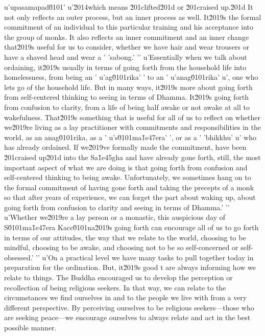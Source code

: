 u'upasamapad\u0101'
u'\u2014which means \u201clifted\u201d or \u201craised up.\u201d It not only reflects an outer process, but an inner process as well. It\u2019s the formal commitment of an individual to this particular training and his acceptance into the group of monks. It also reflects an inner commitment and an inner change that\u2019s useful for us to consider, whether we have hair and wear trousers or have a shaved head and wear a '
'sabong.'
'\n'
u'Essentially when we talk about ordaining, it\u2019s usually in terms of going forth from the household life into homelessness, from being an '
u'ag\u0101rika'
' to an '
u'anag\u0101rika'
u', one who lets go of the household life. But in many ways, it\u2019s more about going forth from self-centered thinking to seeing in terms of Dhamma. It\u2019s going forth from confusion to clarity, from a life of being half awake or not awake at all to wakefulness. That\u2019s something that is useful for all of us to reflect on whether we\u2019re living as a lay practitioner with commitments and responsibilities in the world, as an anag\u0101rika, as a '
u's\u0101ma\u1e47era'
', or as a '
'bhikkhu'
u' who has already ordained. If we\u2019ve formally made the commitment, have been \u201craised up\u201d into the Sa\u1e45gha and have already gone forth, still, the most important aspect of what we are doing is that going forth from confusion and self-centered thinking to being awake. Unfortunately, we sometimes hang on to the formal commitment of having gone forth and taking the precepts of a monk so that after years of experience, we can forget the part about waking up, about going forth from confusion to clarity and seeing in terms of Dhamma.'
'\n'
u'Whether we\u2019re a lay person or a monastic, this auspicious day of S\u0101ma\u1e47era Kacc\u0101na\u2019s going forth can encourage all of us to go forth in terms of our attitudes, the way that we relate to the world, choosing to be mindful, choosing to be awake, and choosing not to be so self-concerned or self-obsessed.'
'\n'
u'On a practical level we have many tasks to pull together today in preparation for the ordination. But, it\u2019s good t are always informing how we relate to things. 
The Buddha encouraged us to develop the perception or recollection of 
being religious seekers. In that way, we can relate to the 
circumstances we find ourselves in and to the people we live with from 
a very different perspective. By perceiving ourselves to be religious 
seekers---those who are seeking peace---we encourage ourselves to 
always relate and act in the best possible manner.

